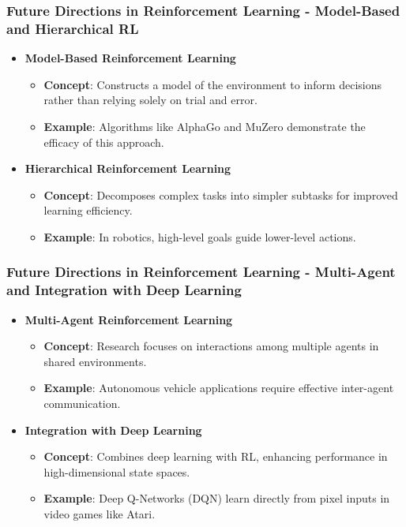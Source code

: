 \documentclass[aspectratio=169]{beamer}
\begin{document}
\begin{frame}[fragile]
    \frametitle{Future Directions in Reinforcement Learning - Model-Based and Hierarchical RL}
    \begin{itemize}
        \item \textbf{Model-Based Reinforcement Learning}
        \begin{itemize}
            \item \textbf{Concept}: Constructs a model of the environment to inform decisions rather than relying solely on trial and error.
            \item \textbf{Example}: Algorithms like AlphaGo and MuZero demonstrate the efficacy of this approach.
        \end{itemize}

        \item \textbf{Hierarchical Reinforcement Learning}
        \begin{itemize}
            \item \textbf{Concept}: Decomposes complex tasks into simpler subtasks for improved learning efficiency.
            \item \textbf{Example}: In robotics, high-level goals guide lower-level actions.
        \end{itemize}
    \end{itemize}
\end{frame}

\begin{frame}[fragile]
    \frametitle{Future Directions in Reinforcement Learning - Multi-Agent and Integration with Deep Learning}
    \begin{itemize}
        \item \textbf{Multi-Agent Reinforcement Learning}
        \begin{itemize}
            \item \textbf{Concept}: Research focuses on interactions among multiple agents in shared environments.
            \item \textbf{Example}: Autonomous vehicle applications require effective inter-agent communication.
        \end{itemize}

        \item \textbf{Integration with Deep Learning}
        \begin{itemize}
            \item \textbf{Concept}: Combines deep learning with RL, enhancing performance in high-dimensional state spaces.
            \item \textbf{Example}: Deep Q-Networks (DQN) learn directly from pixel inputs in video games like Atari.
        \end{itemize}
    \end{itemize}
\end{frame}
\end{document}
